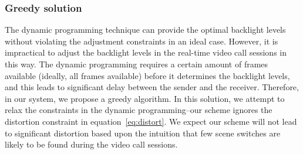 

\subsubsection{Greedy solution}
\label{sec:greedy}
The dynamic programming technique can provide the optimal
backlight levels without violating the adjustment constraints in an
ideal case. However, 
it is impractical to adjust the backlight levels in the real-time
video call sessions in
this way. The dynamic programming requires a certain amount of frames
available (ideally, all frames available) before
it determines the backlight levels, and this leads to significant
delay between the sender and the receiver. 
Therefore, in our system, we propose a greedy algorithm. In this solution,
we attempt to relax the constraints in the dynamic
programming--our scheme ignores the distortion constraint in
equation~\ref{eq:distort}. We expect our scheme will not lead to significant
 distortion based upon the intuition that few scene switches are
likely to be found during the video call sessions. 



